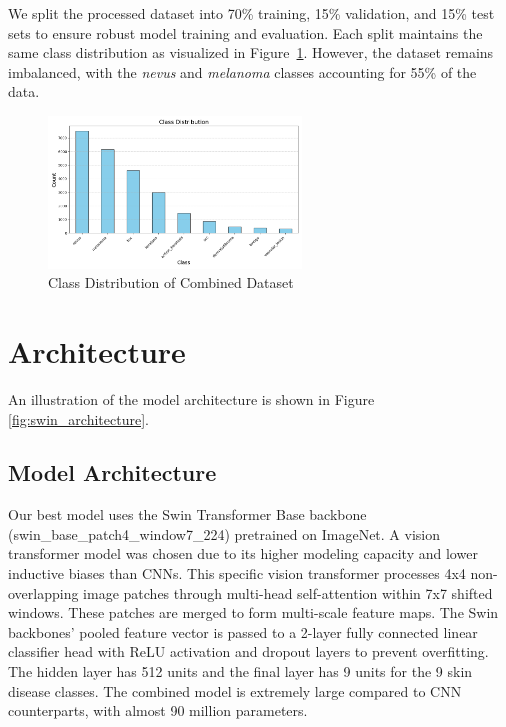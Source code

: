 \documentclass{article} %
\begin{document}
We split the processed dataset into 70\% training, 15\% validation, and 15\% test sets to ensure robust model training and evaluation. Each split maintains the same class distribution as visualized in Figure~\ref{fig:class_distribution}. However, the dataset remains imbalanced, with the \textit{nevus} and \textit{melanoma} classes accounting for 55\% of the data.


\begin{figure}[H]
\begin{center}
\includegraphics[width=0.6\textwidth]{Figs/class_distribution.png}
\end{center}
\caption{Class Distribution of Combined Dataset}
\label{fig:class_distribution}
\end{figure}



\section{Architecture}

An illustration of the model architecture is shown in Figure \ref{fig:swin_architecture}.

\subsection{Model Architecture}

Our best model uses the Swin Transformer Base backbone (swin\_base\_patch4\_window7\_224) pretrained on ImageNet. A vision transformer model was chosen due to its higher modeling capacity and lower inductive biases than CNNs. This specific vision transformer processes 4x4 non-overlapping image patches through multi-head self-attention within 7x7 shifted windows. These patches are merged to form multi-scale feature maps. The Swin backbones' pooled feature vector is passed to a 2-layer fully connected linear classifier head with ReLU activation and dropout layers to prevent overfitting. The hidden layer has 512 units and the final layer has 9 units for the 9 skin disease classes. The combined model is extremely large compared to CNN counterparts, with almost 90 million parameters.
\end{document}
